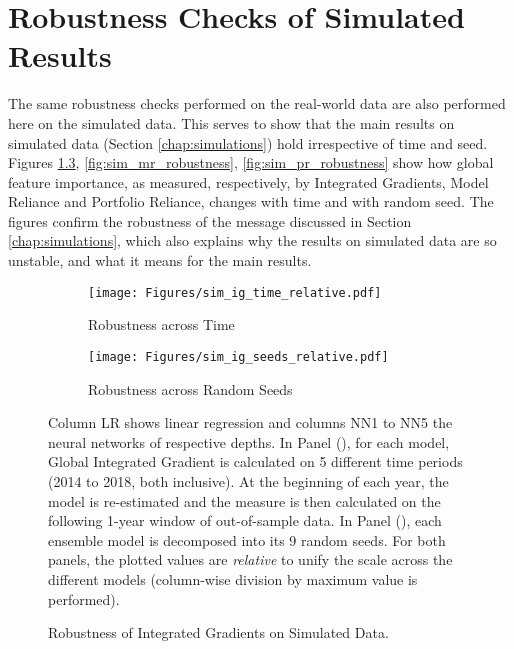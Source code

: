 \chapter{Robustness Checks of Simulated Results}
\label{chap:robustness_simulations}

The same robustness checks performed on the real-world data are also performed here on the simulated data. This serves to show that the main results on simulated data (Section \ref{chap:simulations}) hold irrespective of time and seed. 
Figures \ref{fig:sim_ig_robustness}, \ref{fig:sim_mr_robustness}, \ref{fig:sim_pr_robustness} show how global feature importance, as measured, respectively, by Integrated Gradients, Model Reliance and Portfolio Reliance, changes with time and with random seed. The figures confirm the robustness of the message discussed in Section \ref{chap:simulations}, which also explains why the results on simulated data are so unstable, and what it means for the main results. 


\begin{figure}	
	\centering		
	\begin{subfigure}[t]{\textwidth}
		\texttt{[image: Figures/sim\_ig\_time\_relative.pdf]}
		\caption{Robustness across Time}
		\label{fig:sim_ig_time_relative}
	\end{subfigure}
	
	\begin{subfigure}[t]{\textwidth}
		\centering
		\texttt{[image: Figures/sim\_ig\_seeds\_relative.pdf]}
		\caption{Robustness across Random Seeds}
		\label{fig:sim_ig_seeds_relative}
	\end{subfigure}
	\caption{Robustness of Integrated Gradients on Simulated Data.}
	\medskip
	\small
	Column LR shows linear regression and columns NN1 to NN5 the neural networks of respective depths. In Panel (), for each model, Global Integrated Gradient is calculated on 5 different time periods (2014 to 2018, both inclusive). At the beginning of each year, the model is re-estimated and the measure is then calculated on the following 1-year window of out-of-sample data. In Panel (), each ensemble model is decomposed into its 9 random seeds. For both panels, the plotted values are \textit{relative} to unify the scale across the different models (column-wise division by maximum value is performed).
	\label{fig:sim_ig_robustness}
\end{figure}

